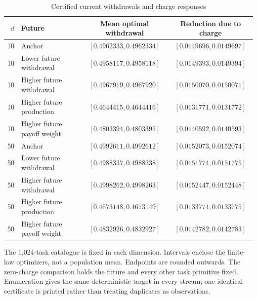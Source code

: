 \begin{table}[htbp]\centering\small
\caption{Certified current withdrawals and charge responses}\label{tab:r21economic}
\begin{tabular}{@{}rlcc@{}}\toprule
$d$ & Future & Mean optimal withdrawal & Reduction due to charge\\ \midrule
10 & Anchor & $[0.4962333,0.4962334]$ & $[0.0149696,0.0149697]$\\
10 & Lower future withdrawal & $[0.4958117,0.4958118]$ & $[0.0149393,0.0149394]$\\
10 & Higher future withdrawal & $[0.4967919,0.4967920]$ & $[0.0150070,0.0150071]$\\
10 & Higher future production & $[0.4644415,0.4644416]$ & $[0.0131771,0.0131772]$\\
10 & Higher future payoff weight & $[0.4803394,0.4803395]$ & $[0.0140592,0.0140593]$\\
50 & Anchor & $[0.4992611,0.4992612]$ & $[0.0152073,0.0152074]$\\
50 & Lower future withdrawal & $[0.4988337,0.4988338]$ & $[0.0151774,0.0151775]$\\
50 & Higher future withdrawal & $[0.4998262,0.4998263]$ & $[0.0152447,0.0152448]$\\
50 & Higher future production & $[0.4673148,0.4673149]$ & $[0.0133774,0.0133775]$\\
50 & Higher future payoff weight & $[0.4832926,0.4832927]$ & $[0.0142782,0.0142783]$\\
\bottomrule\end{tabular}
\par\smallskip\begin{minipage}{.98\textwidth}\footnotesize The 1,024-task catalogue is fixed in each dimension. Intervals enclose the finite-law optimizers, not a population mean. Endpoints are rounded outwards. The zero-charge comparison holds the future and every other task primitive fixed. Enumeration gives the same deterministic target in every stream; one identical certificate is printed rather than treating duplicates as observations.\end{minipage}
\end{table}
